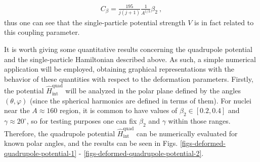 \begin{align}
    C_\beta=\frac{195}{j(j+1)}\frac{1}{A^{1/3}}\beta_2\ ,
\end{align}
thus one can see that the single-particle potential strength $V$ is in fact related to this coupling parameter.

It is worth giving some quantitative results concerning the quadrupole potential and the single-particle Hamiltonian described above. As such, a simple numerical application will be employed, obtaining graphical representations with the behavior of these quantities with respect to the deformation parameters. Firstly, the potential $\hat{H}_\text{int}^\text{quad}$ will be analyzed in the polar plane defined by the angles $(\theta,\varphi)$ (since the spherical harmonics are defined in terms of them). For nuclei near the $A\approx 160$ region, it is common to have values of $\beta_2\in\left[0.2,0.4\right]$ and $\gamma\approx 20^\circ$, so for testing purposes one can fix $\beta_2$ and $\gamma$ within those ranges. Therefore, the quadrupole potential $\hat{H}_\text{int}^\text{quad}$ can be numerically evaluated for known polar angles, and the results can be seen in Figs. \ref{figs-deformed-quadrupole-potential-1} - \ref{figs-deformed-quadrupole-potential-2}.
